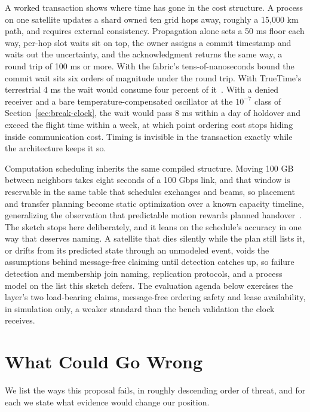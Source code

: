 \documentclass[twocolumn,10pt]{article}
\begin{document}
A worked transaction shows where time has gone in the cost structure. A process on one satellite updates a shard owned ten grid hops away, roughly a 15{,}000 km path, and requires external consistency. Propagation alone sets a 50 ms floor each way, per-hop slot waits sit on top, the owner assigns a commit timestamp and waits out the uncertainty, and the acknowledgment returns the same way, a round trip of 100 ms or more. With the fabric's tens-of-nanoseconds bound the commit wait sits six orders of magnitude under the round trip. With TrueTime's terrestrial 4 ms the wait would consume four percent of it~\cite{corbett2012}. With a denied receiver and a bare temperature-compensated oscillator at the $10^{-7}$ class of Section~\ref{sec:break-clock}, the wait would pass 8 ms within a day of holdover and exceed the flight time within a week, at which point ordering cost stops hiding inside communication cost. Timing is invisible in the transaction exactly while the architecture keeps it so.

Computation scheduling inherits the same compiled structure. Moving 100 GB between neighbors takes eight seconds of a 100 Gbps link, and that window is reservable in the same table that schedules exchanges and beams, so placement and transfer planning become static optimization over a known capacity timeline, generalizing the observation that predictable motion rewards planned handover~\cite{bhattacherjee2020}. The sketch stops here deliberately, and it leans on the schedule's accuracy in one way that deserves naming. A satellite that dies silently while the plan still lists it, or drifts from its predicted state through an unmodeled event, voids the assumptions behind message-free claiming until detection catches up, so failure detection and membership join naming, replication protocols, and a process model on the list this sketch defers. The evaluation agenda below exercises the layer's two load-bearing claims, message-free ordering safety and lease availability, in simulation only, a weaker standard than the bench validation the clock receives.

\section{What Could Go Wrong}\label{sec:risks}
We list the ways this proposal fails, in roughly descending order of threat, and for each we state what evidence would change our position.
\end{document}
